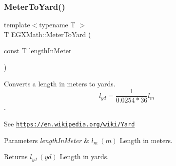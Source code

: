 \subsubsection{\texorpdfstring{Meter\+To\+Yard()}{MeterToYard()}}
{\footnotesize\ttfamily template$<$typename T $>$ \\
T E\+G\+X\+Math\+::\+Meter\+To\+Yard (\begin{DoxyParamCaption}\item[{const T}]{length\+In\+Meter }\end{DoxyParamCaption})}



Converts a length in meters to yards. \[ l_{yd}= \frac{1}{0.0254 * 36} l_{m} \]. 

See \href{https://en.wikipedia.org/wiki/Yard}{\tt https\+://en.\+wikipedia.\+org/wiki/\+Yard} 
\begin{DoxyParams}{Parameters}
{\em length\+In\+Meter} & $ l_{m}\ (m)$ Length in meters. \\
\hline
\end{DoxyParams}
\begin{DoxyReturn}{Returns}
$ l_{yd}\ (yd)$ Length in yards. 
\end{DoxyReturn}
